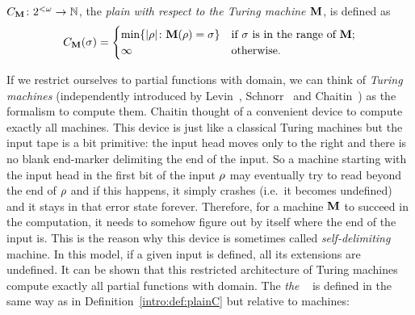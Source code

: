 \begin{definicion}\label{intro:def:plainC}
$C_{{\bf M}}\colon2^{<\omega} \to \mathbb{N}$, 
the {\em plain
\kolcomp with respect to the Turing machine ${\bf M}$}, is defined as
$$
C_{{\bf M}}(\sigma)=
    \begin{cases}
    \min \{| \rho |\colon {\bf M}(\rho)=\sigma \} & \textrm{if $\sigma$ is in the range of ${\bf M}$};\\
    \infty & \textrm{otherwise.}
    \end{cases}
$$
\end{definicion}


If we restrict ourselves to partial \rec functions with \pfree
domain, we can think of  {\em
\pfree Turing machines} (independently introduced by
Levin~\cite{L71,L73}, Schnorr~\cite{S71} and Chaitin~\cite{chaitin1975theory})
as the formalism to compute them. Chaitin thought of a convenient
device to compute exactly all \pfree machines. This device is just
like a classical Turing machines but the input tape is a bit
primitive: the input head moves only to the right and there is no
blank end-marker delimiting the end of the input. So a \pfree
machine starting with the input head in the first bit of the input
$\rho$ may eventually try to read beyond the end of $\rho$ and if
this happens, it simply crashes (i.e.\ it becomes undefined) and
it stays in that error state forever. Therefore, for a \pfree
machine ${\bf M}$ to succeed in the computation, it needs to somehow
figure out by itself where the end of the input is.
This is the reason why this device is sometimes called {\em
self-delimiting} machine. In this model, if a given input is
defined, all its extensions are undefined. It can be shown that
this restricted architecture of Turing machines compute exactly
all partial \rec functions with \pfree domain. The {\em the \pfree
\kolcomp}~\cite{levin1974laws,G74,chaitin1975theory} is defined in the same way as in
Definition~\ref{intro:def:plainC} but relative to \pfree
machines:




